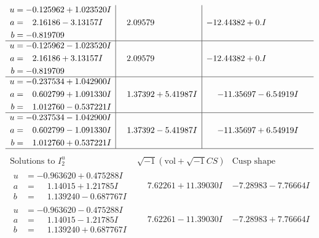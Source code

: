 \documentclass[1p]{elsarticle_modified}
\theoremstyle{definition}
\newcommand{\I}{\sqrt{-1}}
\begin{document}
$$\begin{array}{c|c|c}
\begin{aligned}
u &= -0.125962 + 1.023520 I \\
a &= \phantom{-}2.16186 - 3.13157 I \\
b &= -0.819709\phantom{ +0.000000I}\end{aligned}
 & \phantom{-}2.09579\phantom{ +0.000000I} & -12.44382 + 0. I\phantom{ +0.000000I} \\ \hline\begin{aligned}
u &= -0.125962 - 1.023520 I \\
a &= \phantom{-}2.16186 + 3.13157 I \\
b &= -0.819709\phantom{ +0.000000I}\end{aligned}
 & \phantom{-}2.09579\phantom{ +0.000000I} & -12.44382 + 0. I\phantom{ +0.000000I} \\ \hline\begin{aligned}
u &= -0.237534 + 1.042900 I \\
a &= \phantom{-}0.602799 + 1.091330 I \\
b &= \phantom{-}1.012760 - 0.537221 I\end{aligned}
 & \phantom{-}1.37392 + 5.41987 I & -11.35697 - 6.54919 I \\ \hline\begin{aligned}
u &= -0.237534 - 1.042900 I \\
a &= \phantom{-}0.602799 - 1.091330 I \\
b &= \phantom{-}1.012760 + 0.537221 I\end{aligned}
 & \phantom{-}1.37392 - 5.41987 I & -11.35697 + 6.54919 I\\
 \hline 
 \end{array}$$\newpage$$\begin{array}{c|c|c}  
\text{Solutions to }I^u_{2}& \I (\text{vol} + \sqrt{-1}CS) & \text{Cusp shape}\\
 \hline 
\begin{aligned}
u &= -0.963620 + 0.475288 I \\
a &= \phantom{-}1.14015 + 1.21785 I \\
b &= \phantom{-}1.139240 - 0.687767 I\end{aligned}
 & \phantom{-}7.62261 + 11.39030 I & -7.28983 - 7.76664 I \\ \hline\begin{aligned}
u &= -0.963620 - 0.475288 I \\
a &= \phantom{-}1.14015 - 1.21785 I \\
b &= \phantom{-}1.139240 + 0.687767 I\end{aligned}
 & \phantom{-}7.62261 - 11.39030 I & -7.28983 + 7.76664 I \\ \hline\begin{aligned}

\end{aligned}
\end{array}$$
\end{document}
